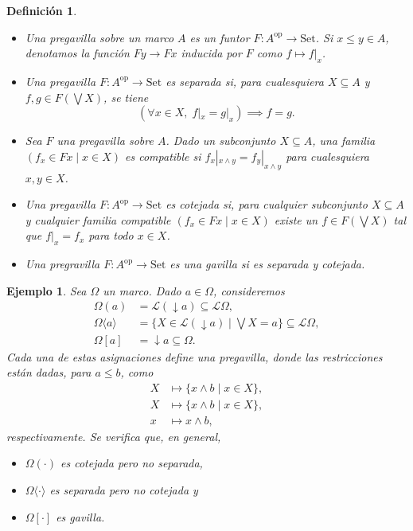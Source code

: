 \documentclass[12pt,letterpaper,titlepage]{article}
\newtheorem*{defn}{Definición}
\newtheorem*{exa}{Ejemplo}
\theoremstyle{definition}
\newcommand\Sup{\bigvee}
\newcommand\down{{\downarrow}}
\renewcommand\inf{\wedge}
\renewcommand\cal[1]{\mathcal{#1}}
\newcommand\<{\langle}
\renewcommand\>{\rangle}
\newcommand{\Con}{\mathrm{Set}}
\newcommand{\op}{\mathrm{op}}
\begin{document}
\begin{defn}
    \leavevmode
    \begin{itemize}
        \item
        Una pregavilla sobre un marco $A$
        es un funtor $F:A^\op\to\Con$.
        Si $x\leq y\in A$, denotamos la función
        $Fy\to Fx$ inducida por $F$ como $f\mapsto f|_x$.
        \item
        Una pregavilla $F:A^\op\to\Con$ es separada si,
        para cualesquiera $X\subseteq A$ y $f,g\in F(\Sup X)$,
        se tiene
        \[
            (\forall x\in X,\; f|_x=g|_x)\implies f=g
        .\]
        \item
        Sea $F$ una pregavilla sobre $A$.
        Dado un subconjunto $X\subseteq A$,
        una familia $(f_x\in Fx\mid x\in X)$
        es compatible si $f_x|_{x\inf y}=f_y|_{x\inf y}$
        para cualesquiera $x,y\in X$.
        \item
        Una pregavilla $F:A^\op\to\Con$ es cotejada si,
        para cualquier subconjunto $X\subseteq A$
        y cualquier familia compatible
        $(f_x\in Fx\mid x\in X)$
        existe un $f\in F(\Sup X)$ tal que
        $f|_x=f_x$ para todo $x\in X$.
        \item
        Una pregravilla $F:A^\op\to\Con$ es una gavilla
        si es separada y cotejada.
    \end{itemize}
\end{defn}

\begin{exa}
    Sea $\Omega$ un marco.
    Dado $a\in\Omega$, consideremos
    \begin{align*}
        \Omega(a)
            &= \cal L(\down a)
            \subseteq\cal L\Omega, \\
        \Omega\<a\>
            &= \{X\in\cal L(\down a)\mid\Sup X=a\}
            \subseteq\cal L\Omega, \\
        \Omega[a]
            &= \down a
            \subseteq\Omega.
    \end{align*}
    Cada una de estas asignaciones define una pregavilla,
    donde las restricciones están dadas, para $a\leq b$, como
    \begin{align*}
        X &\mapsto \{x\inf b\mid x\in X\}, \\
        X &\mapsto \{x\inf b\mid x\in X\}, \\
        x &\mapsto x\inf b,
    \end{align*}
    respectivamente.
    Se verifica que, en general,
    \begin{itemize}
        \item $\Omega(\cdot)$ es cotejada pero no separada,
        \item $\Omega\<\cdot\>$ es separada pero no cotejada y
        \item $\Omega[\cdot]$ es gavilla.
    \end{itemize}
\end{exa}
\end{document}
